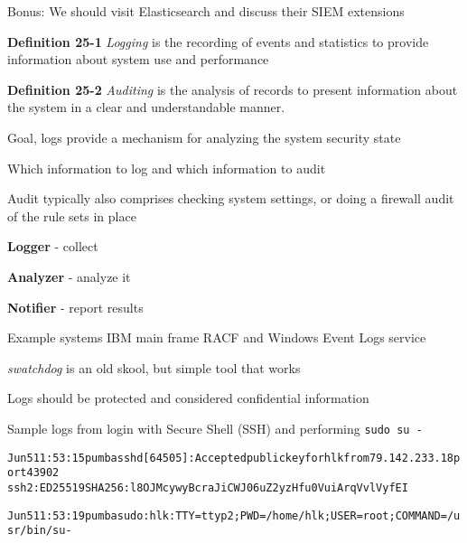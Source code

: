 \documentclass[Screen16to9,17pt]{foils}
\begin{document}
Bonus: We should visit Elasticsearch and discuss their SIEM extensions


\begin{list1}
\item {\bf Definition 25-1} \emph{Logging} is the recording of events and statistics to provide information about system use and performance
\item {\bf Definition 25-2} \emph{Auditing} is the analysis of records to present information about the system in a clear and understandable manner.
\item Goal, logs provide a mechanism for analyzing the system security state
\item Which information to log and which information to audit
\item Audit typically also comprises checking system settings, or doing a firewall audit of the rule sets in place
\end{list1}


\begin{list1}
\item {\bf Logger} - collect
\item {\bf Analyzer} - analyze it
\item {\bf Notifier} - report results
\item Example systems IBM main frame RACF and Windows Event Logs service
\item \emph{swatchdog} is an old skool, but simple tool that works
\item Logs should be protected and considered confidential information
\end{list1}

Sample logs from login with Secure Shell (SSH) and performing \verb+sudo su -+
\begin{alltt}\footnotesize
Jun  5 11:53:15 pumba sshd[64505]: Accepted publickey for hlk from 79.142.233.18 port 43902
 ssh2: ED25519 SHA256:l8OJMcywyBcraJiCWJ06uZ2yzHfu0VuiArqVvlVyfEI

Jun  5 11:53:19 pumba sudo:      hlk : TTY=ttyp2 ; PWD=/home/hlk ; USER=root ; COMMAND=/usr/bin/su -
\end{alltt}


\end{document}
